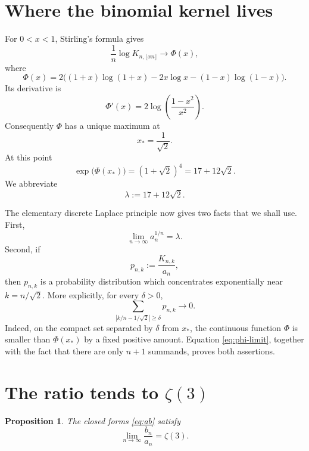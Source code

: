 \documentclass[11pt]{article}
\newtheorem{proposition}{Proposition}
\theoremstyle{remark}
\newcommand{\zetaThree}{\zeta(3)}
\begin{document}
\section{Where the binomial kernel lives}

For \(0<x<1\), Stirling's formula gives
\begin{equation}\label{eq:phi-limit}
 \frac1n\log K_{n,\lfloor xn\rfloor}\longrightarrow\Phi(x),
\end{equation}
where
\begin{equation}\label{eq:phi}
 \Phi(x)
 =
 2\bigl((1+x)\log(1+x)-2x\log x-(1-x)\log(1-x)\bigr).
\end{equation}
Its derivative is
\[
 \Phi'(x)=2\log\left(\frac{1-x^2}{x^2}\right).
\]
Consequently \(\Phi\) has a unique maximum at
\[
 x_*=\frac1{\sqrt2}.
\]
At this point
\[
 \exp\bigl(\Phi(x_*)\bigr)
 =(1+\sqrt2)^4
 =17+12\sqrt2.
\]
We abbreviate
\begin{equation}\label{eq:lambda}
 \lambda:=17+12\sqrt2.
\end{equation}

The elementary discrete Laplace principle now gives two facts that we shall
use.  First,
\begin{equation}\label{eq:a-growth}
 \lim_{n\to\infty}a_n^{1/n}=\lambda.
\end{equation}
Second, if
\[
 p_{n,k}:=\frac{K_{n,k}}{a_n},
\]
then \(p_{n,k}\) is a probability distribution which concentrates
exponentially near \(k=n/\sqrt2\).  More explicitly, for every
\(\delta>0\),
\begin{equation}\label{eq:concentration}
 \sum_{\left|k/n-1/\sqrt2\right|\geq\delta}p_{n,k}
 \longrightarrow0.
\end{equation}
Indeed, on the compact set separated by \(\delta\) from \(x_*\), the
continuous function \(\Phi\) is smaller than \(\Phi(x_*)\) by a fixed positive
amount.  Equation \eqref{eq:phi-limit}, together with the fact that there are
only \(n+1\) summands, proves both assertions.

\section{The ratio tends to \texorpdfstring{\(\zeta(3)\)}{zeta(3)}}

\begin{proposition}\label{prop:ratio}
The closed forms \eqref{eq:ab} satisfy
\[
 \lim_{n\to\infty}\frac{b_n}{a_n}=\zetaThree.
\]
\end{proposition}
\end{document}
